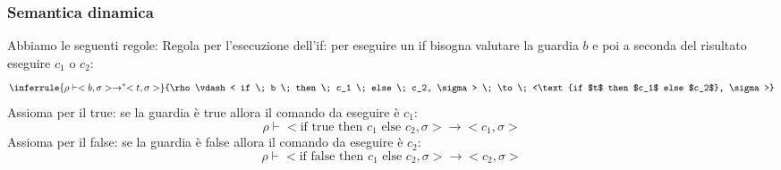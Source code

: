 \documentclass[a4paper]{article}
\begin{document}
\subsubsection*{Semantica dinamica}

Abbiamo le seguenti regole:
Regola per l'esecuzione dell'if: per eseguire un if bisogna valutare 
la guardia $b$ e poi a seconda del risultato eseguire $c_1$ o $c_2$:
\[
  \inferrule 
  {\rho \vdash <b, \sigma > \to^* <t, \sigma>}
  {\rho \vdash < if \; b \; then \; c_1 \; else \; c_2, \sigma>  \; \to \; <\text{if $t$ then $c_1$ else $c_2$}, \sigma >}
\]
Assioma per il true: se la guardia è true allora il comando da eseguire è $c_1$:
\[
  \rho \vdash < \text{if true then $c_1$ else $c_2$}, \sigma > \to <c_1, \sigma>
\]
Assioma per il false: se la guardia è false allora il comando da eseguire è $c_2$:
\[
  \rho \vdash < \text{if false then $c_1$ else $c_2$}, \sigma > \to <c_2, \sigma>
\]
\end{document}
